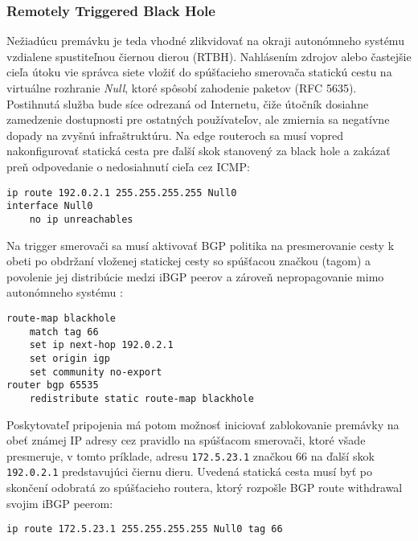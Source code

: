 \documentclass[12pt, a4paper]{article}
\begin{document}
\subsubsection{Remotely Triggered Black Hole} 
Nežiadúcu premávku je teda vhodné zlikvidovať na okraji 
autonómneho systému vzdialene spustiteľnou čiernou dierou (RTBH). Nahlásením zdrojov alebo 
častejšie cieľa útoku vie správca siete vložiť do spúšťacieho smerovača statickú cestu na virtuálne 
rozhranie \emph{Null}, ktoré spôsobí zahodenie paketov (RFC 5635). Postihnutá služba bude síce odrezaná 
od Internetu,  čiže útočník dosiahne zamedzenie dostupnosti pre ostatných používateľov, ale zmiernia sa 
negatívne dopady na zvyšnú infraštruktúru. Na edge routeroch sa musí vopred nakonfigurovať statická cesta 
pre ďalší skok stanovený za black hole a zakázať preň odpovedanie o nedosiahnutí cieľa cez ICMP:
\begin{lstlisting}
ip route 192.0.2.1 255.255.255.255 Null0
interface Null0 
    no ip unreachables
\end{lstlisting}
Na trigger smerovači sa musí aktivovať BGP politika na presmerovanie cesty k obeti 
po obdržaní vloženej statickej cesty so spúšťacou značkou (tagom) a povolenie jej distribúcie
medzi iBGP peerov a zároveň nepropagovanie mimo autonómneho systému \cite{cisco-rtbh}:
\newpage
\begin{lstlisting}
route-map blackhole
    match tag 66
    set ip next-hop 192.0.2.1
    set origin igp
    set community no-export
router bgp 65535
    redistribute static route-map blackhole
\end{lstlisting}
Poskytovateľ pripojenia má potom možnosť iniciovať zablokovanie premávky na obeť známej IP adresy
cez pravidlo na spúšťacom smerovači, ktoré všade presmeruje, v tomto príklade, adresu \verb|172.5.23.1| 
značkou 66 na ďalší skok \verb|192.0.2.1| predstavujúci čiernu dieru. Uvedená statická cesta musí byť 
po skončení odobratá zo spúšťacieho routera, ktorý rozpošle BGP route withdrawal svojim iBGP peerom:
\begin{lstlisting}
ip route 172.5.23.1 255.255.255.255 Null0 tag 66
\end{lstlisting}
\end{document}
